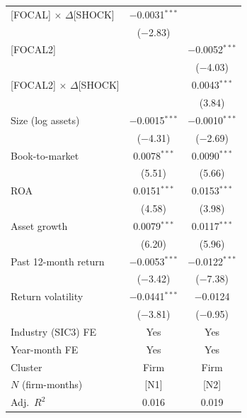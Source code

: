 \begin{table}[!htb]
\begin{threeparttable}
\begin{tabular*}{\textwidth}{@{\extracolsep{\fill}}lcc}
{}[FOCAL] $\times$ $\Delta$[SHOCK] & $-$0.0031$^{***}$ &             \\
                                   & ($-$2.83)      &                \\[3pt]

{}[FOCAL2]                         &                & $-$0.0052$^{***}$ \\
                                   &                & ($-$4.03)      \\[3pt]

{}[FOCAL2] $\times$ $\Delta$[SHOCK]&                & 0.0043$^{***}$ \\
                                   &                & (3.84)         \\
Size (log assets)                  & $-$0.0015$^{***}$ & $-$0.0010$^{***}$ \\
                                   & ($-$4.31)      & ($-$2.69)      \\[3pt]
Book-to-market                     & 0.0078$^{***}$ & 0.0090$^{***}$ \\
                                   & (5.51)         & (5.66)         \\[3pt]
ROA                                & 0.0151$^{***}$ & 0.0153$^{***}$ \\
                                   & (4.58)         & (3.98)         \\[3pt]
Asset growth                       & 0.0079$^{***}$ & 0.0117$^{***}$ \\
                                   & (6.20)         & (5.96)         \\[3pt]
Past 12-month return               & $-$0.0053$^{***}$ & $-$0.0122$^{***}$ \\
                                   & ($-$3.42)      & ($-$7.38)      \\[3pt]
Return volatility                  & $-$0.0441$^{***}$ & $-$0.0124    \\
                                   & ($-$3.81)      & ($-$0.95)      \\
\midrule
Industry (SIC3) FE                 & Yes            & Yes            \\
Year-month FE                      & Yes            & Yes            \\
Cluster                            & Firm           & Firm           \\
$N$ (firm-months)                  & [N1]           & [N2]           \\
Adj.\ $R^2$                        & 0.016          & 0.019          \\
\bottomrule
\end{tabular*}


\end{threeparttable}
\end{table}
